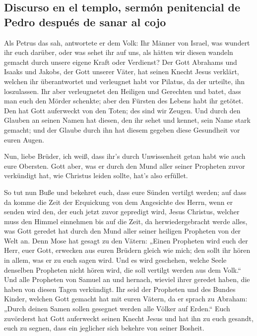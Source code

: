 \hypertarget{discurso-en-el-templo-sermuxf3n-penitencial-de-pedro-despuuxe9s-de-sanar-al-cojo}{%
\subsection{Discurso en el templo, sermón penitencial de Pedro después
de sanar al
cojo}\label{discurso-en-el-templo-sermuxf3n-penitencial-de-pedro-despuuxe9s-de-sanar-al-cojo}}

 Als Petrus das sah, antwortete er dem Volk: Ihr Männer
von Israel, was wundert ihr euch darüber, oder was sehet ihr auf uns,
als hätten wir diesen wandeln gemacht durch unsere eigene Kraft oder
Verdienst?  Der Gott Abrahams und Isaaks und Jakobs, der
Gott unserer Väter, hat seinen Knecht Jesus verklärt, welchen ihr
überantwortet und verleugnet habt vor Pilatus, da der urteilte, ihn
loszulassen.  Ihr aber verleugnetet den Heiligen und
Gerechten und batet, dass man euch den Mörder schenkte; 
aber den Fürsten des Lebens habt ihr getötet. Den hat Gott auferweckt
von den Toten; des sind wir Zeugen.  Und durch den
Glauben an seinen Namen hat diesen, den ihr sehet und kennet, sein Name
stark gemacht; und der Glaube durch ihn hat diesem gegeben diese
Gesundheit vor euren Augen.

 Nun, liebe Brüder, ich weiß, dass ihr's durch
Unwissenheit getan habt wie auch eure Obersten.  Gott
aber, was er durch den Mund aller seiner Propheten zuvor verkündigt hat,
wie Christus leiden sollte, hat's also erfüllet.

 So tut nun Buße und bekehret euch, dass eure Sünden
vertilgt werden;  auf dass da komme die Zeit der
Erquickung von dem Angesichte des Herrn, wenn er senden wird den, der
euch jetzt zuvor gepredigt wird, Jesus Christus,  welcher
muss den Himmel einnehmen bis auf die Zeit, da herwiedergebracht werde
alles, was Gott geredet hat durch den Mund aller seiner heiligen
Propheten von der Welt an.  Denn Mose hat gesagt zu den
Vätern: „Einen Propheten wird euch der Herr, euer Gott, erwecken aus
euren Brüdern gleich wie mich; den sollt ihr hören in allem, was er zu
euch sagen wird.  Und es wird geschehen, welche Seele
denselben Propheten nicht hören wird, die soll vertilgt werden aus dem
Volk.``  Und alle Propheten von Samuel an und hernach,
wieviel ihrer geredet haben, die haben von diesen Tagen verkündigt.
 Ihr seid der Propheten und des Bundes Kinder, welchen
Gott gemacht hat mit euren Vätern, da er sprach zu Abraham: „Durch
deinen Samen sollen gesegnet werden alle Völker auf Erden.``
 Euch zuvörderst hat Gott auferweckt seinen Knecht Jesus
und hat ihn zu euch gesandt, euch zu segnen, dass ein jeglicher sich
bekehre von seiner Bosheit.

